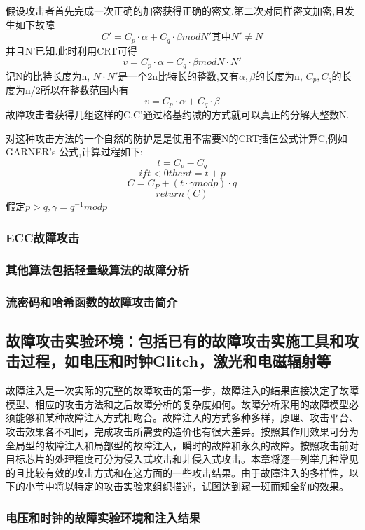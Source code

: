 \documentclass[a4paper,12pt]{article}
\begin{document}
\begin{CJK}{UTF8}{gkai}
假设攻击者首先完成一次正确的加密获得正确的密文.第二次对同样密文加密,且发生如下故障
$$C'=C_{p}\cdot\alpha+C_{q}\cdot\beta mod N'  其中 N'≠N$$
并且N’已知.此时利用CRT可得
$$v=C_{p}\cdot\alpha+C_{q}\cdot\beta mod N\cdot N'$$ 
记N的比特长度为n, $N\cdot N'$是一个2n比特长的整数,又有$\alpha,\beta$的长度为n, $C_{p},C_{q}$的长度为n/2所以在整数范围内有
$$v=C_{p}\cdot\alpha+C_{q}\cdot\beta$$
故障攻击者获得几组这样的C,C'通过格基约减的方式就可以真正的分解大整数N.

对这种攻击方法的一个自然的防护是是使用不需要N的CRT插值公式计算C,例如GARNER’s 公式,计算过程如下:
$$t=C_{p}-C_{q} $$
$$if t<0 then t=t+p $$
$$C=C_{P}+(t\cdot\gamma mod p)\cdot q $$
$$return (C)$$
假定$p>q,\gamma=q^{-1} mod p$

\subsubsection{ECC故障攻击}
\subsubsection{其他算法包括轻量级算法的故障分析}
\subsubsection{流密码和哈希函数的故障攻击简介}

\subsection{故障攻击实验环境：包括已有的故障攻击实施工具和攻击过程，如电压和时钟Glitch，激光和电磁辐射等}
故障注入是一次实际的完整的故障攻击的第一步，故障注入的结果直接决定了故障模型、相应的攻击方法和之后故障分析的复杂度如何。故障分析采用的故障模型必须能够和某种故障注入方式相吻合。故障注入的方式多种多样，原理、攻击平台、攻击效果各不相同，完成攻击所需要的造价也有很大差异。按照其作用效果可分为全局型的故障注入和局部型的故障注入，瞬时的故障和永久的故障。按照攻击前对目标芯片的处理程度可分为侵入式攻击和非侵入式攻击。本章将逐一列举几种常见的且比较有效的攻击方式和在这方面的一些攻击结果。由于故障注入的多样性，以下的小节中将以特定的攻击实验来组织描述，试图达到窥一斑而知全豹的效果。

\subsubsection{电压和时钟的故障实验环境和注入结果}


\end{CJK}
\end{document}
